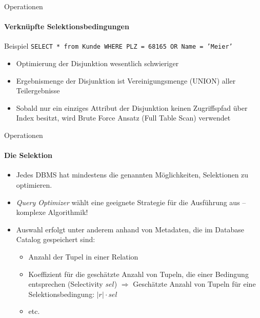 \begin{frame}[fragile]{Operationen}
\framesubtitle{Verknüpfte Selektionsbedingungen}
\begin{block}{Beispiel}
\texttt{SELECT * from Kunde WHERE PLZ = 68165 OR Name = 'Meier'}
\end{block}
\begin{itemize}
	\item Optimierung der Disjunktion wesentlich schwieriger
	\item Ergebnismenge der Disjunktion ist Vereinigungsmenge (UNION) aller Teilergebnisse 
	\item Sobald nur ein einziges Attribut der Disjunktion keinen Zugriffspfad über Index besitzt, wird 
	Brute Force Ansatz (Full Table Scan) verwendet
\end{itemize}
\end{frame}

\begin{frame}[fragile]{Operationen}
\framesubtitle{Die Selektion}
\begin{itemize}
	\item Jedes DBMS hat mindestens die genannten Möglichkeiten, Selektionen zu optimieren. 
	\item \emph{Query Optimizer} wählt eine geeignete Strategie für die Ausführung aus -- komplexe Algorithmik!
	\item Auswahl erfolgt unter anderem anhand von Metadaten, die im Database Catalog gespeichert sind: 
	\begin{itemize}
		\item Anzahl der Tupel in einer Relation 
		\item Koeffizient für die geschätzte Anzahl von Tupeln, die einer Bedingung entsprechen (Selectivity $sel$)		
		\nl
		$\Rightarrow$ Gesch\"atzte Anzahl von Tupeln f\"ur eine Selektionsbedingung: $|r|\cdot sel$				
		\item etc. 
	\end{itemize}
\end{itemize}
\end{frame}

